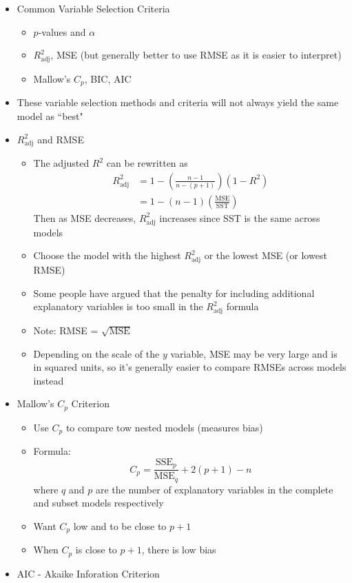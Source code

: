 \documentclass[12pt]{article}
\begin{document}
\begin{itemize}
\item Common Variable Selection Criteria \begin{itemize} 
\item $p$-values and $\alpha$ 
\item $R^2_{\text{adj}}$, MSE (but generally better to use RMSE as it is easier to interpret) 
\item Mallow's $C_p$, BIC, AIC \end{itemize} 
\item These variable selection methods and criteria will not always yield the same model as ``best" 
\item $R^2_{\text{adj}}$ and RMSE \begin{itemize}
\item The adjusted $R^2$ can be rewritten as $$ \begin{aligned} R^2_{\text{adj}} &= 1 - \left( \frac{n-1}{n-(p+1)}\right)(1 - R^2) \\ &= 1 - (n-1)\left( \frac{\text{MSE}}{\text{SST}} \right) \end{aligned} $$ Then as MSE decreases, $R^2_{\text{adj}}$ increases since SST is the same across models
\item Choose the model with the highest $R^2_{\text{adj}}$ or the lowest MSE (or lowest RMSE)
\item Some people have argued that the penalty for including additional explanatory variables is too small in the $R^2_{\text{adj}}$ formula 
\item Note: RMSE = $\sqrt{\text{MSE}}$ 
\item Depending on the scale of the $y$ variable, MSE may be very large and is in squared units, so it's generally easier to compare RMSEs across models instead \end{itemize} 
\item Mallow's $C_p$ Criterion \begin{itemize}
\item Use $C_p$ to compare tow nested models (measures bias) 
\item Formula: $$C_p = \frac{\text{SSE}_p}{\text{MSE}_q} + 2(p+1) - n $$ where $q$ and $p$ are the number of explanatory variables in the complete and subset models respectively 
\item Want $C_p$ low and to be close to $p+1$ 
\item When $C_p$ is close to $p+1$, there is low bias \end{itemize}
\item AIC - Akaike Inforation Criterion \begin{itemize} 

\end{itemize}
\end{itemize}
\end{document}
